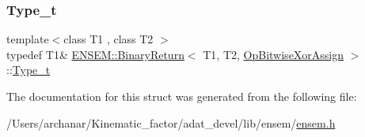\mbox{\label{structENSEM_1_1BinaryReturn_3_01T1_00_01T2_00_01OpBitwiseXorAssign_01_4_afa71b93b033427a13f9ffcbcb4ffb6dc}} 
\subsubsection{\texorpdfstring{Type\_t}{Type\_t}\hspace{0.1cm}{\footnotesize\ttfamily [2/2]}}
{\footnotesize\ttfamily template$<$class T1 , class T2 $>$ \\
typedef T1\& \mbox{\hyperlink{structENSEM_1_1BinaryReturn}{E\+N\+S\+E\+M\+::\+Binary\+Return}}$<$ T1, T2, \mbox{\hyperlink{structENSEM_1_1OpBitwiseXorAssign}{Op\+Bitwise\+Xor\+Assign}} $>$\+::\mbox{\hyperlink{structENSEM_1_1BinaryReturn_3_01T1_00_01T2_00_01OpBitwiseXorAssign_01_4_afa71b93b033427a13f9ffcbcb4ffb6dc}{Type\+\_\+t}}}



The documentation for this struct was generated from the following file\+:\begin{DoxyCompactItemize}
\item 
/\+Users/archanar/\+Kinematic\+\_\+factor/adat\+\_\+devel/lib/ensem/\mbox{\hyperlink{lib_2ensem_2ensem_8h}{ensem.\+h}}\end{DoxyCompactItemize}
